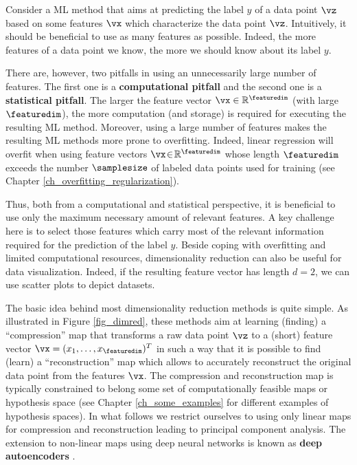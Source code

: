 \documentclass[12pt]{report}
\begin{document}
Consider a ML method that aims at predicting the label $y$  of a data point $\vz$ 
based on some features $\vx$ which characterize the data point $\vz$. Intuitively, it 
should be beneficial to use as many features as possible. Indeed, the more features 
of a data point we know, the more we should know about its label $y$. 

There are, however, two pitfalls in using an unnecessarily large number of features. 
The first one is a {\bf computational pitfall} and the second one is a {\bf statistical pitfall}. 
The larger the feature vector $\vx \in \mathbb{R}^{\featuredim}$ (with large $\featuredim$), 
the more computation (and storage) is required for executing the resulting ML method. 
Moreover, using a large number of features makes the resulting ML methods more prone to 
overfitting. Indeed, linear regression will overfit when using feature vectors $\vx\!\in\!\mathbb{R}^{\featuredim}$ 
whose length $\featuredim$ exceeds the number $\samplesize$ of labeled data points used 
for training (see Chapter \ref{ch_overfitting_regularization}). 

Thus, both from a computational and statistical perspective, it is beneficial to use 
only the maximum necessary amount of relevant features. A key challenge here is 
to select those features which carry most of the relevant information required for 
the prediction of the label $y$. Beside coping with overfitting and limited computational 
resources, dimensionality reduction can also be useful for data visualization. Indeed, if 
the resulting feature vector has length $d=2$, we can use scatter plots to depict datasets. 

The basic idea behind most dimensionality reduction methods is quite simple. As 
illustrated in Figure \ref{fig_dimred}, these methods aim at learning (finding) a ``compression'' 
map that transforms a raw data point $\vz$ to a (short) feature vector $\vx=(x_{1},\ldots,x_{\featuredim})^{T}$ 
in such a way that it is possible to find (learn) a ``reconstruction'' map which allows to accurately 
reconstruct the original data point from the features $\vx$. The compression and reconstruction 
map is typically constrained to belong some set of computationally feasible maps or hypothesis 
space (see Chapter \ref{ch_some_examples} for different examples of hypothesis spaces). In what 
follows we restrict ourselves to using only linear maps for compression and reconstruction leading 
to principal component analysis. The extension to non-linear maps using deep neural networks 
is known as {\bf deep autoencoders} \cite[Ch. 14]{Goodfellow-et-al-2016}. 
\end{document}
